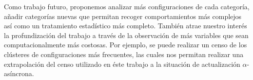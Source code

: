 \documentclass[../proyecto.tex]{memoir}
\begin{document}
Como trabajo futuro, proponemos analizar más configuraciones de cada categoría, añadir categorías nuevas que permitan recoger comportamientos más complejos así como un tratamiento estadístico más completo. También atrae nuestro interés la profundización del trabajo a través de la observación de más variables que sean computacionalmente más costosas. Por ejemplo, se puede realizar un censo de los clústeres de configuraciones más frecuentes, las cuales nos permitan realizar una extrapolación del censo utilizado en éste trabajo a la situación de actualización $\alpha$-asíncrona.



\end{document}
